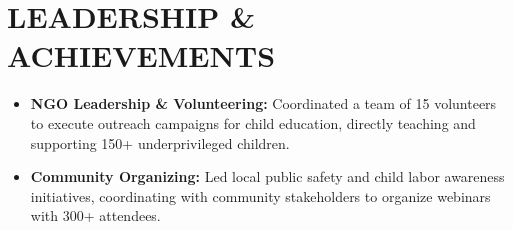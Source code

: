 \documentclass[letterpaper,10pt]{article}
\newcommand{\resumeItem}[1]{
  \item\small{
    {#1 \vspace{-2pt}}
  }
}
\newcommand{\resumeItemListStart}{\begin{itemize}}
\newcommand{\resumeItemListEnd}{\end{itemize}\vspace{-5pt}}
\begin{document}
\section{LEADERSHIP \& ACHIEVEMENTS}
    \resumeItemListStart
        \resumeItem{\textbf{NGO Leadership \& Volunteering:} Coordinated a team of 15 volunteers to execute outreach campaigns for child education, directly teaching and supporting 150+ underprivileged children.}
        \resumeItem{\textbf{Community Organizing:} Led local public safety and child labor awareness initiatives, coordinating with community stakeholders to organize webinars with 300+ attendees.}
    \resumeItemListEnd
\end{document}
